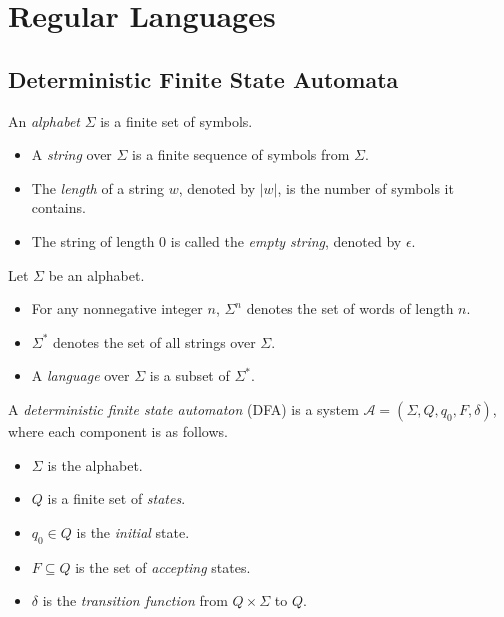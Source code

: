 \chapter{Regular Languages}
\section{Deterministic Finite State Automata}
\begin{definition}\label{def:string}
  An \emph{alphabet} $\Sigma$ is a finite set of symbols.
  \begin{itemize}
    \item A \emph{string} over $\Sigma$ is a finite sequence of symbols from
      $\Sigma$.
    \item The \emph{length} of a string $w$, denoted by $|w|$, is the number of
      symbols it contains.
    \item The string of length $0$ is called the \emph{empty string}, denoted
      by $\epsilon$.
  \end{itemize}
\end{definition}

\begin{definition}\label{def:language}
  Let $\Sigma$ be an alphabet.
  \begin{itemize}
    \item For any nonnegative integer $n$, $\Sigma^n$ denotes the set of words
      of length $n$.
    \item $\Sigma^*$ denotes the set of all strings over $\Sigma$.
    \item A \emph{language} over $\Sigma$ is a subset of $\Sigma^*$.
  \end{itemize}
\end{definition}

\begin{definition}\label{def:dfa}
  A \emph{deterministic finite state automaton} (DFA) is a system
  $\mathcal{A} = (\Sigma, Q, q_0, F, \delta)$, where each component is as
  follows.
  \begin{itemize}
    \item $\Sigma$ is the alphabet.
    \item $Q$ is a finite set of \emph{states}.
    \item $q_0 \in Q$ is the \emph{initial} state.
    \item $F \subseteq Q$ is the set of \emph{accepting} states.
    \item $\delta$ is the \emph{transition function} from $Q \times \Sigma$ to
      $Q$.
  \end{itemize}
\end{definition}

